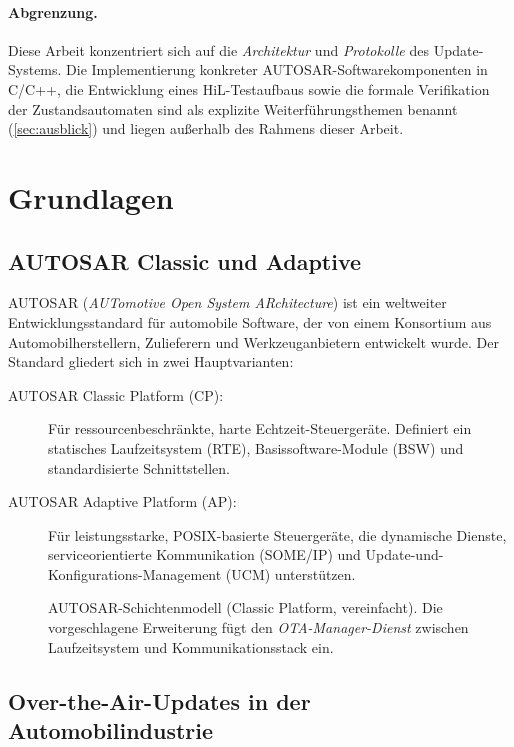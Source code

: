 ﻿\documentclass[12pt,a4paper,twoside]{article}
\begin{document}
\paragraph{Abgrenzung.}
Diese Arbeit konzentriert sich auf die \emph{Architektur} und
\emph{Protokolle} des Update-Systems. Die Implementierung
konkreter AUTOSAR-Softwarekomponenten in C/C++, die Entwicklung
eines HiL-Testaufbaus sowie die formale Verifikation der
Zustandsautomaten sind als explizite Weiterführungsthemen benannt
(\cref{sec:ausblick}) und liegen außerhalb des Rahmens
dieser Arbeit.

\section{Grundlagen}
\label{sec:grundlagen}

\subsection{AUTOSAR Classic und Adaptive}
\label{subsec:autosar}

AUTOSAR (\textit{AUTomotive Open System ARchitecture}) ist ein weltweiter
Entwicklungsstandard für automobile Software, der von einem Konsortium aus
Automobilherstellern, Zulieferern und Werkzeuganbietern entwickelt wurde.
Der Standard gliedert sich in zwei Hauptvarianten:

\begin{description}
  \item[AUTOSAR Classic Platform (CP):] Für ressourcenbeschränkte,
    harte Echtzeit-Steuer\-geräte. Definiert ein statisches Laufzeitsystem
    (RTE), Basissoftware-Module (BSW) und standardisierte Schnittstellen.
  \item[AUTOSAR Adaptive Platform (AP):] Für leistungsstarke,
    POSIX-basierte Steuergeräte, die dynamische Dienste, serviceorientierte
    Kommunikation (SOME/IP) und Update-und-Konfigurations-Management (UCM)
    unterstützen.
\end{description}

\begin{figure}[h!]
  \centering
  
  \caption{AUTOSAR-Schichtenmodell (Classic Platform, vereinfacht).
    Die vorgeschlagene Erweiterung fügt den \emph{OTA-Manager-Dienst}
    zwischen Laufzeitsystem und Kommunikationsstack ein.}
  \label{fig:autosar_layers}
\end{figure}

\subsection{Over-the-Air-Updates in der Automobilindustrie}
\end{document}
